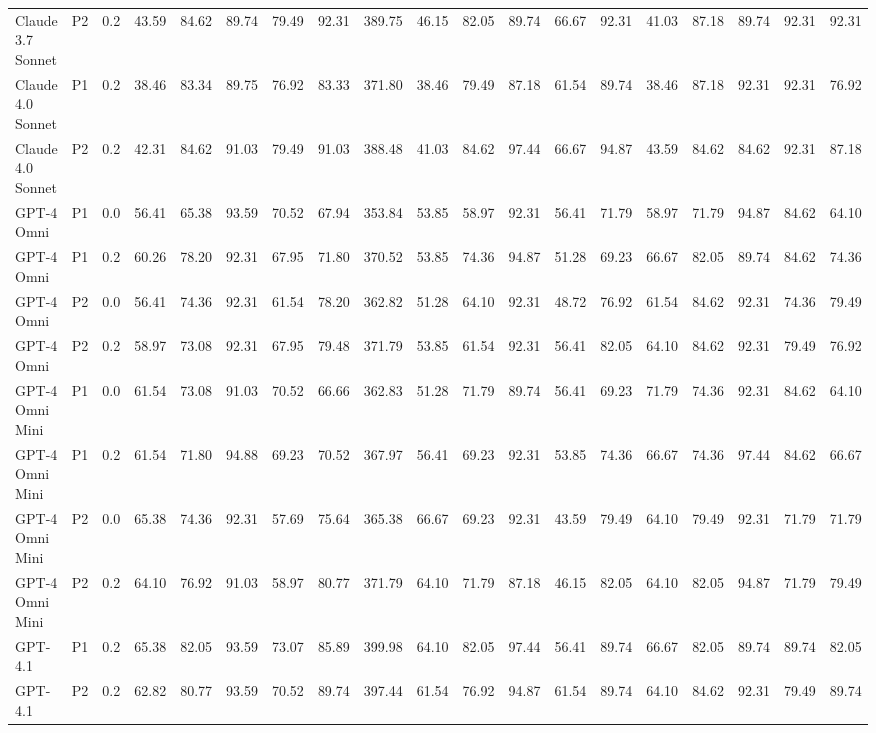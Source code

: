 \begin{landscape}
\begin{longtable}{|l|c|c|ccccc|c|ccccc|ccccc|}
        Claude 3.7 Sonnet & P2 & 0.2 & 43.59 & 84.62 & 89.74 & 79.49 & 92.31 & 389.75 & 46.15 & 82.05 & 89.74 & 66.67 & 92.31 & 41.03 & 87.18 & 89.74 & 92.31 & 92.31 \\
        Claude 4.0 Sonnet & P1 & 0.2 & 38.46 & 83.34 & 89.75 & 76.92 & 83.33 & 371.80 & 38.46 & 79.49 & 87.18 & 61.54 & 89.74 & 38.46 & 87.18 & 92.31 & 92.31 & 76.92 \\
        Claude 4.0 Sonnet & P2 & 0.2 & 42.31 & 84.62 & 91.03 & 79.49 & 91.03 & 388.48 & 41.03 & 84.62 & 97.44 & 66.67 & 94.87 & 43.59 & 84.62 & 84.62 & 92.31 & 87.18 \\
        GPT-4 Omni & P1 & 0.0 & 56.41 & 65.38 & 93.59 & 70.52 & 67.94 & 353.84 & 53.85 & 58.97 & 92.31 & 56.41 & 71.79 & 58.97 & 71.79 & 94.87 & 84.62 & 64.10 \\
        GPT-4 Omni & P1 & 0.2 & 60.26 & 78.20 & 92.31 & 67.95 & 71.80 & 370.52 & 53.85 & 74.36 & 94.87 & 51.28 & 69.23 & 66.67 & 82.05 & 89.74 & 84.62 & 74.36 \\
        GPT-4 Omni & P2 & 0.0 & 56.41 & 74.36 & 92.31 & 61.54 & 78.20 & 362.82 & 51.28 & 64.10 & 92.31 & 48.72 & 76.92 & 61.54 & 84.62 & 92.31 & 74.36 & 79.49 \\
        GPT-4 Omni & P2 & 0.2 & 58.97 & 73.08 & 92.31 & 67.95 & 79.48 & 371.79 & 53.85 & 61.54 & 92.31 & 56.41 & 82.05 & 64.10 & 84.62 & 92.31 & 79.49 & 76.92 \\
        GPT-4 Omni Mini & P1 & 0.0 & 61.54 & 73.08 & 91.03 & 70.52 & 66.66 & 362.83 & 51.28 & 71.79 & 89.74 & 56.41 & 69.23 & 71.79 & 74.36 & 92.31 & 84.62 & 64.10 \\
        GPT-4 Omni Mini & P1 & 0.2 & 61.54 & 71.80 & 94.88 & 69.23 & 70.52 & 367.97 & 56.41 & 69.23 & 92.31 & 53.85 & 74.36 & 66.67 & 74.36 & 97.44 & 84.62 & 66.67 \\
        GPT-4 Omni Mini & P2 & 0.0 & 65.38 & 74.36 & 92.31 & 57.69 & 75.64 & 365.38 & 66.67 & 69.23 & 92.31 & 43.59 & 79.49 & 64.10 & 79.49 & 92.31 & 71.79 & 71.79 \\
        GPT-4 Omni Mini & P2 & 0.2 & 64.10 & 76.92 & 91.03 & 58.97 & 80.77 & 371.79 & 64.10 & 71.79 & 87.18 & 46.15 & 82.05 & 64.10 & 82.05 & 94.87 & 71.79 & 79.49 \\
        GPT-4.1 & P1 & 0.2 & 65.38 & 82.05 & 93.59 & 73.07 & 85.89 & 399.98 & 64.10 & 82.05 & 97.44 & 56.41 & 89.74 & 66.67 & 82.05 & 89.74 & 89.74 & 82.05 \\
        GPT-4.1 & P2 & 0.2 & 62.82 & 80.77 & 93.59 & 70.52 & 89.74 & 397.44 & 61.54 & 76.92 & 94.87 & 61.54 & 89.74 & 64.10 & 84.62 & 92.31 & 79.49 & 89.74 \\

\end{longtable}
\end{landscape}
